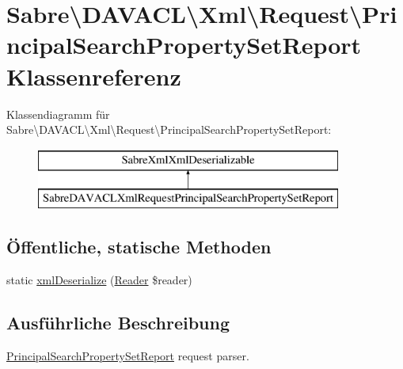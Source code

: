 \hypertarget{class_sabre_1_1_d_a_v_a_c_l_1_1_xml_1_1_request_1_1_principal_search_property_set_report}{}\section{Sabre\textbackslash{}D\+A\+V\+A\+CL\textbackslash{}Xml\textbackslash{}Request\textbackslash{}Principal\+Search\+Property\+Set\+Report Klassenreferenz}
\label{class_sabre_1_1_d_a_v_a_c_l_1_1_xml_1_1_request_1_1_principal_search_property_set_report}
Klassendiagramm für Sabre\textbackslash{}D\+A\+V\+A\+CL\textbackslash{}Xml\textbackslash{}Request\textbackslash{}Principal\+Search\+Property\+Set\+Report\+:\begin{figure}[H]
\begin{center}
\leavevmode
\includegraphics[height=2.000000cm]{class_sabre_1_1_d_a_v_a_c_l_1_1_xml_1_1_request_1_1_principal_search_property_set_report}
\end{center}
\end{figure}
\subsection*{Öffentliche, statische Methoden}
\begin{DoxyCompactItemize}
\item 
static \mbox{\hyperlink{class_sabre_1_1_d_a_v_a_c_l_1_1_xml_1_1_request_1_1_principal_search_property_set_report_aac942dda2c328563364c634768d34a80}{xml\+Deserialize}} (\mbox{\hyperlink{class_sabre_1_1_xml_1_1_reader}{Reader}} \$reader)
\end{DoxyCompactItemize}


\subsection{Ausführliche Beschreibung}
\mbox{\hyperlink{class_sabre_1_1_d_a_v_a_c_l_1_1_xml_1_1_request_1_1_principal_search_property_set_report}{Principal\+Search\+Property\+Set\+Report}} request parser.

